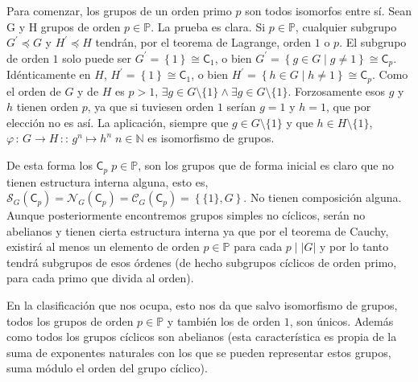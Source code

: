 \documentclass[12pt,a4paper,fleqn,spanish,final,openright]{extbook}
\theoremstyle{definition}
\theoremstyle{remark}
\begin{document}
Para comenzar, los grupos de un orden primo $p$ son todos isomorfos entre sí.
Sean G y H grupos de orden $p      \in \mathds{P}$. La prueba es clara.
Si $p       \in \mathds{P}$, cualquier subgrupo
$G^\prime       \preccurlyeq       G$ y $H^\prime       \preccurlyeq       H$
tendrán, por el teorema de Lagrange, orden $1$ o $p$. El subgrupo de orden $1$
solo puede ser
$G^\prime = \left\lbrace 1\right\rbrace       \cong       \mathsf{C}_1$,
o bien $G^\prime = \left\lbrace g      \in G∣g      \neq       1
\right\rbrace       \cong       \mathsf{C}_p$. Idénticamente en
$H$, $H^\prime = \left\lbrace 1\right\rbrace       \cong       \mathsf{C}_1$,
o bien $H^\prime = \left\lbrace h      \in G∣h      \neq       1\right\rbrace
   \cong       \mathsf{C}_p$. Como el orden de $G$ y de $H$ es $p>1$,
$      \exists       g      \in G\setminus\{1\}      \wedge
   \exists       g      \in G\setminus\{1\}$. Forzosamente esos $g$ y $h$ tienen orden $p$,
ya que si tuviesen orden $1$ serían $g=1$ y $h=1$, que por elección no es así.
La aplicación, siempre que $g      \in G\setminus\{1\}$ y que $h    \in H\setminus\{1\}$,
$\varphi \,:\,G    \longrightarrow    H\,::\, g^n    \mapsto h^n \; n    \in \mathds{N}$ es
isomorfismo de grupos.

De esta forma los $\mathsf{C}_{p}\;p    \in \mathds{P}$, son los grupos que de forma
inicial es claro que no tienen estructura interna alguna, esto es,
$\mathcal{S}_{G}{(\mathsf{C}_{p})} = \mathcal{N}_{G}{(\mathsf{C}_{p})} =
\mathcal{C}_{G}{(\mathsf{C}_{p})} = \left\lbrace{\{1\},G}\right\rbrace$.
No tienen composición alguna. Aunque posteriormente encontremos grupos simples
no cíclicos, serán no abelianos y tienen cierta estructura interna ya que por el
teorema de Cauchy, existirá al menos un elemento de orden $p    \in \mathds{P}$
para cada $p∣\left|G\right|$ y por lo tanto tendrá subgrupos de esos órdenes
(de hecho subgrupos cíclicos de orden primo, para cada primo que divida al orden).

En la clasificación que nos ocupa, esto nos da que salvo isomorfismo de grupos,
todos los grupos de orden $p      \in \mathds{P}$ y también los de orden $1$, son
únicos. Además como todos los grupos cíclicos son abelianos (esta característica
es propia de la suma de exponentes naturales con los que se pueden representar
estos grupos, suma módulo el orden del grupo cíclico).
\end{document}
